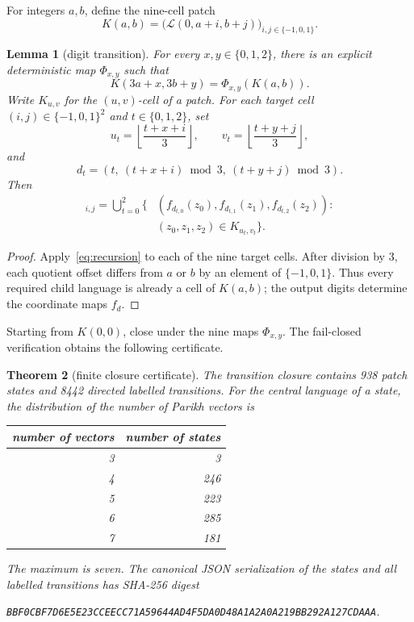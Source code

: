 \documentclass[11pt]{article}
\newtheorem{theorem}{Theorem}[section]
\newtheorem{lemma}[theorem]{Lemma}
\newcommand{\Lang}{\mathcal L}
\begin{document}
For integers $a,b$, define the nine-cell patch
\begin{equation}
K(a,b)=\big(\Lang(0,a+i,b+j)\big)_{i,j\in\{-1,0,1\}}.
\label{eq:patch}
\end{equation}

\begin{lemma}[digit transition]\label{lem:transition}
For every $x,y\in\{0,1,2\}$, there is an explicit deterministic map
$\Phi_{x,y}$ such that
\begin{equation}
K(3a+x,3b+y)=\Phi_{x,y}(K(a,b)).
\label{eq:transition}
\end{equation}
Write $K_{u,v}$ for the $(u,v)$-cell of a patch. For each target cell
$(i,j)\in\{-1,0,1\}^2$ and $t\in\{0,1,2\}$, set
\[
u_t=\left\lfloor\frac{t+x+i}{3}\right\rfloor,
\qquad
v_t=\left\lfloor\frac{t+y+j}{3}\right\rfloor,
\]
and
\[
d_t=(t,\ (t+x+i)\bmod3,\ (t+y+j)\bmod3).
\]
Then
\begin{align}
[\Phi_{x,y}(K)]_{i,j}
=\bigcup_{t=0}^2\{&(
f_{d_{t,0}}(z_0),f_{d_{t,1}}(z_1),f_{d_{t,2}}(z_2)):\nonumber\\[-2mm]
&(z_0,z_1,z_2)\in K_{u_t,v_t}\}.
\label{eq:explicit-transition}
\end{align}
\end{lemma}

\begin{proof}
Apply~\eqref{eq:recursion} to each of the nine target cells. After division
by $3$, each quotient offset differs from $a$ or $b$ by an element of
$\{-1,0,1\}$. Thus every required child language is already a cell of
$K(a,b)$; the output digits determine the coordinate maps $f_d$.
\end{proof}

Starting from $K(0,0)$, close under the nine maps $\Phi_{x,y}$. The fail-closed
verification obtains the following certificate.

\begin{theorem}[finite closure certificate]\label{thm:certificate}
The transition closure contains 938 patch states and 8442 directed labelled
transitions. For the central language of a state, the distribution of the
number of Parikh vectors is
\begin{center}
\begin{tabular}{@{}rr@{}}
\toprule
number of vectors & number of states\\
\midrule
3 & 3\\
4 & 246\\
5 & 223\\
6 & 285\\
7 & 181\\
\bottomrule
\end{tabular}
\end{center}
The maximum is seven. The canonical JSON serialization of the states and all
labelled transitions has SHA-256 digest
\begin{center}
\small\texttt{BBF0CBF7D6E5E23CCEECC71A59644AD4F5DA0D48A1A2A0A219BB292A127CDAAA}.
\end{center}
\end{theorem}
\end{document}
